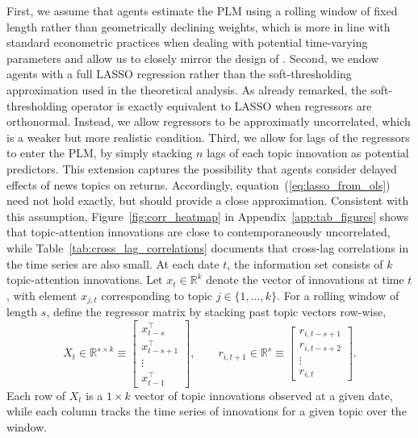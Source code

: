 \documentclass[11pt]{article}
\begin{document}
First, we assume that agents estimate the PLM using a rolling window of fixed length rather than geometrically declining weights, which is more in line with standard econometric practices when dealing with potential time-varying parameters and allow us to closely mirror
the design of \cite{Chinco2019}.
Second, we endow agents with a full LASSO regression rather than the soft-thresholding approximation used in the theoretical analysis.
As already remarked, the soft-thresholding operator is exactly equivalent to LASSO when regressors are orthonormal.
Instead, we allow regressors to be approximatly uncorrelated, which is a weaker but more realistic condition.
Third, we allow for lags of the regressors to enter the PLM, by simply stacking $n$ lags of each topic innovation as potential predictors.
This extension captures the possibility that agents consider delayed effects of news topics on returns.
Accordingly, equation~(\ref{eq:lasso_from_ols}) need not hold exactly, but should provide a close approximation.
Consistent with this assumption, Figure~\ref{fig:corr_heatmap} in Appendix~\ref{app:tab_figures} shows that topic-attention innovations are close to contemporaneously uncorrelated, while Table~\ref{tab:cross_lag_correlations} documents that cross-lag correlations in the time series are also small.
At each date \(t\), the information set consists of \(k\) topic-attention innovations. Let
\(x_t \in \mathbb{R}^{k}\) denote the vector of innovations at time \(t\), with element
\(x_{j,t}\) corresponding to topic \(j \in \{1,\ldots,k\}\).
For a rolling window of length \(s\), define the regressor matrix by stacking past topic
vectors row-wise,
\begin{equation}
X_t \in \mathbb{R}^{s \times k}
\equiv
\begin{bmatrix}
x_{t-s}^\top \\
x_{t-s+1}^\top \\
\vdots \\
x_{t-1}^\top
\end{bmatrix},
\qquad
r_{i,t+1} \in \mathbb{R}^{s}
\equiv
\begin{bmatrix}
r_{i,t-s+1} \\
r_{i,t-s+2} \\
\vdots \\
r_{i,t}
\end{bmatrix}.
\end{equation}
Each row of \(X_t\) is a \(1 \times k\) vector of topic innovations observed at a given date,
while each column tracks the time series of innovations for a given topic over the window.
\end{document}
